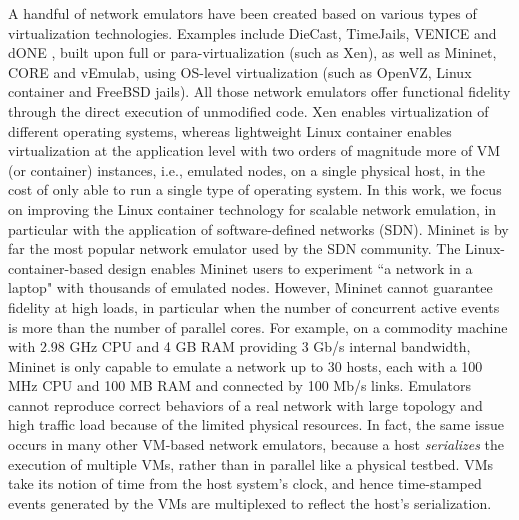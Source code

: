 A handful of network emulators have been created based on various types of virtualization technologies. 
Examples include DieCast\cite{DieCast}, TimeJails\cite{TimeJails}, VENICE\cite{VirtualTimeMachine} and dONE \cite{RelativisticTime}, built upon full or para-virtualization (such as Xen\cite{Xen}), as well as Mininet\cite{LaptopSDN, ReproNetExprCBE}, CORE\cite{CORE} and vEmulab\cite{Emulab}, using OS-level virtualization (such as OpenVZ\cite{OpenVZ}, Linux container\cite{LXC} and FreeBSD jails\cite{FreeBSDJails}). All those network emulators offer functional fidelity through the direct execution of unmodified code. 
Xen enables virtualization of different operating systems, whereas lightweight Linux container enables virtualization at the application level with two orders of magnitude more of VM (or container) instances, i.e., emulated nodes, on a single physical host, in the cost of only able to run a single type of operating system. 
In this work, we focus on improving the Linux container technology for scalable network emulation, in particular with the application of software-defined networks (SDN). 
Mininet\cite{LaptopSDN} is by far the most popular network emulator used by the SDN community\cite{Frenetic, AbsNetUpd, LivMigEntNet}. 
The Linux-container-based design enables Mininet users to experiment ``a network in a laptop" with thousands of emulated nodes. 
However, Mininet cannot guarantee fidelity at high loads, in particular when the number of concurrent active events is more than the number of parallel cores. 
For example, on a commodity machine with 2.98 GHz CPU and 4 GB RAM providing 3 Gb/s internal bandwidth, Mininet is only capable to emulate a network up to 30 hosts, each with a 100 MHz CPU and 100 MB RAM and connected by 100 Mb/s links\cite{ReproNetExprCBE}. 
Emulators cannot reproduce correct behaviors of a real network with large topology and high traffic load because of the limited physical resources. 
In fact, the same issue occurs in many other VM-based network emulators, because a host \emph{serializes} the execution of multiple VMs, rather than in parallel like a physical testbed. 
VMs take its notion of time from the host system's clock, and hence time-stamped events generated by the VMs are multiplexed to reflect the host's serialization.

